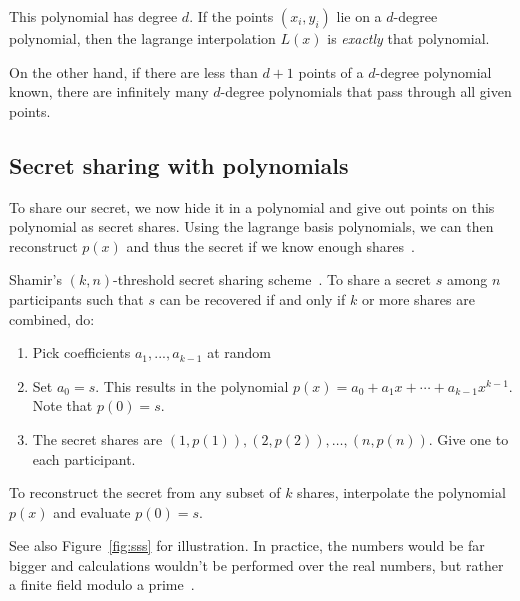 This polynomial has degree $d$. If the points $(x_i, y_i)$ lie on a $d$-degree polynomial, then the lagrange interpolation $L(x)$ is \emph{exactly} that polynomial.

On the other hand, if there are less than $d+1$ points of a $d$-degree polynomial known, there are infinitely many $d$-degree polynomials that pass through all given points.~\cite{shamir_how_1979}


\subsection{Secret sharing with polynomials}
To share our secret, we now hide it in a polynomial and give out points on this polynomial as secret shares.
Using the lagrange basis polynomials, we can then reconstruct $p(x)$ and thus the secret if we know enough shares~\cite{shamir_how_1979}.



\begin{definition}
    Shamir's $(k, n)$-threshold secret sharing scheme~\cite{shamir_how_1979}.
    To share a secret $s$ among $n$ participants such that $s$ can be recovered if and only if $k$ or more shares are combined, do:
    \begin{enumerate}
        \item Pick coefficients $a_1, ..., a_{k-1}$ at random 
        \item Set $a_0 = s$. This results in the polynomial $p(x) = a_0 + a_1x + \cdots + a_{k-1}x^{k-1}$. Note that $p(0) = s$.
        \item The secret shares are $(1, p(1)), (2, p(2)), \dots, (n, p(n))$. Give one to each participant.
    \end{enumerate}
    To reconstruct the secret from any subset of $k$ shares, interpolate the polynomial $p(x)$ and evaluate $p(0) = s$. 
\end{definition}

See also Figure~\ref{fig:sss} for illustration.
In practice, the numbers would be far bigger and calculations wouldn't be performed over the real numbers, but rather a finite field modulo a prime~\cite{shamir_how_1979}.


